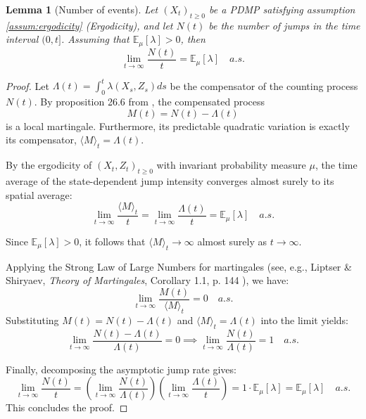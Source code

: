 \documentclass{article}
\newtheorem{lemma}{Lemma}
\begin{document}
\begin{lemma}[Number of events]
    \label{lemma:number_of_events}
    Let $(X_t)_{t \geq 0}$ be a PDMP satisfying assumption \ref{assum:ergodicity} (Ergodicity), and let $N(t)$ be the number of jumps in the time interval $(0, t]$. Assuming that $\mathbb{E}_{\mu}[\lambda] > 0$, then
    \[
    \lim_{t \to \infty} \frac{N(t)}{t} = \mathbb{E}_{\mu}[\lambda] \quad a.s.
    \]
\end{lemma}
\begin{proof}
    Let $\Lambda(t) = \int_0^t \lambda(X_s,Z_s) ds$ be the compensator of the counting process $N(t)$. By proposition 26.6 from \cite{davis1993markov}, the compensated process 
    \[
    M(t) = N(t) - \Lambda(t)
    \]
    is a local martingale. Furthermore, its predictable quadratic variation is exactly its compensator, $\langle M \rangle_t = \Lambda(t)$.
    
    By the ergodicity of $(X_t,Z_t)_{t \geq 0}$ with invariant probability measure $\mu$, the time average of the state-dependent jump intensity converges almost surely to its spatial average:
    \[
    \lim_{t \to \infty} \frac{\langle M \rangle_t}{t} = \lim_{t \to \infty} \frac{\Lambda(t)}{t} = \mathbb{E}_{\mu}[\lambda] \quad a.s.
    \]
    
    Since $\mathbb{E}_{\mu}[\lambda] > 0$, it follows that $\langle M \rangle_t \to \infty$ almost surely as $t \to \infty$. 
    
    Applying the Strong Law of Large Numbers for martingales (see, e.g., Liptser \& Shiryaev, \emph{Theory of Martingales}, Corollary 1.1, p. 144 \cite{liptser1989theory}), we have:
    \[
    \lim_{t \to \infty} \frac{M(t)}{\langle M \rangle_t} = 0 \quad a.s.
    \]
    Substituting $M(t) = N(t) - \Lambda(t)$ and $\langle M \rangle_t = \Lambda(t)$ into the limit yields:
    \[
    \lim_{t \to \infty} \frac{N(t) - \Lambda(t)}{\Lambda(t)} = 0 \implies \lim_{t \to \infty} \frac{N(t)}{\Lambda(t)} = 1 \quad a.s.
    \]
    
    Finally, decomposing the asymptotic jump rate gives:
    \[
    \lim_{t \to \infty} \frac{N(t)}{t} = \left( \lim_{t \to \infty} \frac{N(t)}{\Lambda(t)} \right) \left( \lim_{t \to \infty} \frac{\Lambda(t)}{t} \right) = 1 \cdot \mathbb{E}_{\mu}[\lambda] = \mathbb{E}_{\mu}[\lambda] \quad a.s.
    \]
    This concludes the proof.
\end{proof}
\end{document}
